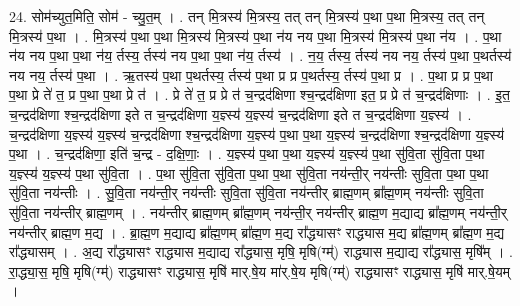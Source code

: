 \documentclass[17pt]{extarticle}
\begin{document}
24. सोम॑च्युत॒मिति॒ सोम॑ - च्यु॒त॒म् । . तन् मि॒त्रस्य॑ मि॒त्रस्य॒ तत् तन् मि॒त्रस्य॑ प॒था प॒था मि॒त्रस्य॒ तत् तन् मि॒त्रस्य॑ प॒था । . मि॒त्रस्य॑ प॒था प॒था मि॒त्रस्य॑ मि॒त्रस्य॑ प॒था न॑य नय प॒था मि॒त्रस्य॑ मि॒त्रस्य॑ प॒था न॑य । . प॒था न॑य नय प॒था प॒था न॑य॒ र्तस्य॒ र्तस्य॑ नय प॒था प॒था न॑य॒ र्तस्य॑ । . न॒य॒ र्तस्य॒ र्तस्य॑ नय नय॒ र्तस्य॑ प॒था प॒थर्तस्य॑ नय नय॒ र्तस्य॑ प॒था । . ऋ॒तस्य॑ प॒था प॒थर्तस्य॒ र्तस्य॑ प॒था प्र प्र प॒थर्तस्य॒ र्तस्य॑ प॒था प्र । . प॒था प्र प्र प॒था प॒था प्रे ते॑ त॒ प्र प॒था प॒था प्रे त॑ । . प्रे ते॑ त॒ प्र प्रे त॑ च॒न्द्रद॑क्षिणा श्च॒न्द्रद॑क्षिणा इत॒ प्र प्रे त॑ च॒न्द्रद॑क्षिणाः । . इ॒त॒ च॒न्द्रद॑क्षिणा श्च॒न्द्रद॑क्षिणा इते त च॒न्द्रद॑क्षिणा य॒ज्ञ्स्य॑ य॒ज्ञ्स्य॑ च॒न्द्रद॑क्षिणा इते त च॒न्द्रद॑क्षिणा य॒ज्ञ्स्य॑ । . च॒न्द्रद॑क्षिणा य॒ज्ञ्स्य॑ य॒ज्ञ्स्य॑ च॒न्द्रद॑क्षिणा श्च॒न्द्रद॑क्षिणा य॒ज्ञ्स्य॑ प॒था प॒था य॒ज्ञ्स्य॑ च॒न्द्रद॑क्षिणा श्च॒न्द्रद॑क्षिणा य॒ज्ञ्स्य॑ प॒था । . च॒न्द्रद॑क्षिणा॒ इति॑ च॒न्द्र - द॒क्षि॒णाः॒ । . य॒ज्ञ्स्य॑ प॒था प॒था य॒ज्ञ्स्य॑ य॒ज्ञ्स्य॑ प॒था सु॑वि॒ता सु॑वि॒ता प॒था य॒ज्ञ्स्य॑ य॒ज्ञ्स्य॑ प॒था सु॑वि॒ता । . प॒था सु॑वि॒ता सु॑वि॒ता प॒था प॒था सु॑वि॒ता नय॑न्ती॒र् नय॑न्तीः सुवि॒ता प॒था प॒था सु॑वि॒ता नय॑न्तीः । . सु॒वि॒ता नय॑न्ती॒र् नय॑न्तीः सुवि॒ता सु॑वि॒ता नय॑न्तीर् ब्राह्म॒णम् ब्रा᳚ह्म॒णम् नय॑न्तीः सुवि॒ता सु॑वि॒ता 
नय॑न्तीर् ब्राह्म॒णम् । . नय॑न्तीर् ब्राह्म॒णम् ब्रा᳚ह्म॒णम् नय॑न्ती॒र् नय॑न्तीर् ब्राह्म॒ण म॒द्याद्य ब्रा᳚ह्म॒णम् नय॑न्ती॒र् नय॑न्तीर् ब्राह्म॒ण म॒द्य । . ब्रा॒ह्म॒ण म॒द्याद्य ब्रा᳚ह्म॒णम् ब्रा᳚ह्म॒ण म॒द्य रा᳚द्ध्यासꣳ राद्ध्यास म॒द्य ब्रा᳚ह्म॒णम् ब्रा᳚ह्म॒ण म॒द्य रा᳚द्ध्यासम् । . अ॒द्य रा᳚द्ध्यासꣳ राद्ध्यास म॒द्याद्य रा᳚द्ध्यास॒ मृषि॒ मृषि(ग्म्॑) राद्ध्यास म॒द्याद्य रा᳚द्ध्यास॒ मृषि᳚म् । . रा॒द्ध्या॒स॒ मृषि॒ मृषि(ग्म्॑) राद्ध्यासꣳ राद्ध्यास॒ मृषि॑ मार्.षे॒य मा॑र्.षे॒य मृषि(ग्म्॑) राद्ध्यासꣳ राद्ध्यास॒ मृषि॑ मार्.षे॒यम् । \newline
\end{document}
